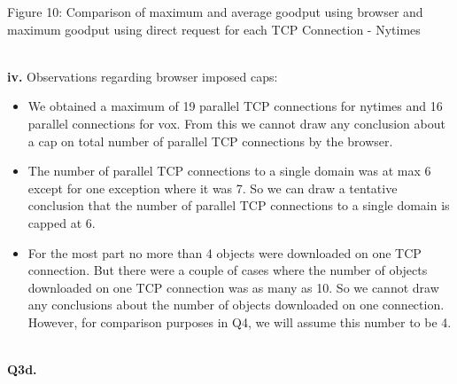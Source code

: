 \documentclass[12pt]{article}
\begin{document}
{
\begin{center}Figure 10: Comparison of maximum and average goodput using browser and maximum goodput using direct request for each TCP Connection - Nytimes\end{center}
}
~\\
\textbf{iv.} Observations regarding browser imposed caps:
\begin{itemize}
\item We obtained a maximum of 19 parallel TCP connections for nytimes and 16 parallel connections for vox. From this we cannot draw any conclusion about a cap on total number of parallel TCP connections by the browser. 
\item The number of parallel TCP connections to a single domain was at max 6 except for one exception where it was 7. So we can draw a tentative conclusion that the number of parallel TCP connections to a single domain is capped at 6.
\item For the most part no more than 4 objects were downloaded on one TCP connection. But there were a couple of cases where the number of objects downloaded on one TCP connection was as many as 10. So we cannot draw any conclusions about the number of objects downloaded on one connection. However, for comparison purposes in Q4, we will assume this number to be 4. 
\end{itemize}
~\\\textbf{Q3d.}
\end{document}
